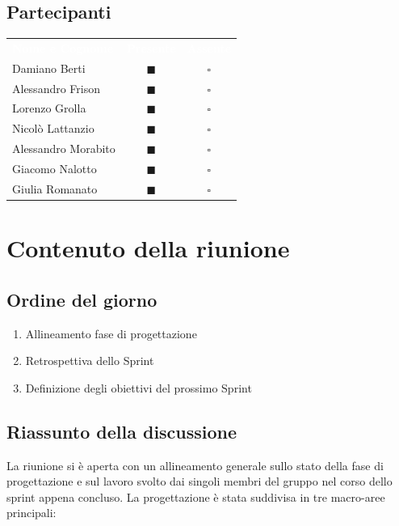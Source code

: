 \documentclass[a4paper, 11pt]{article}
\begin{document}
\subsection{Partecipanti}
\begin{center}
    \begin{tabular}{>{\raggedright\arraybackslash}p{6cm} c c}
        \rowcolor{AccentColor}
        \textcolor{white}{\textbf{Nome e Cognome}} & 
        \textcolor{white}{\textbf{Presente}} & 
        \textcolor{white}{\textbf{Assente}} \\
        
        Damiano Berti     & \textcolor{AccentColor}{$\blacksquare$}    & $\square$        \\
        Alessandro Frison     & \textcolor{AccentColor}{$\blacksquare$}    & $\square$        \\
        Lorenzo Grolla     & \textcolor{AccentColor}{$\blacksquare$}    & $\square$        \\
        Nicolò Lattanzio    & \textcolor{AccentColor}{$\blacksquare$}    & $\square$        \\
        Alessandro Morabito   & \textcolor{AccentColor}{$\blacksquare$}    & $\square$        \\
        Giacomo Nalotto   & \textcolor{AccentColor}{$\blacksquare$}    & $\square$        \\
        Giulia Romanato   & \textcolor{AccentColor}{$\blacksquare$}    & $\square$        \\
    \end{tabular}
\end{center}

\section{Contenuto della riunione}
\subsection{Ordine del giorno}
\begin{enumerate}
    \item Allineamento fase di progettazione
    \item Retrospettiva dello Sprint
    \item Definizione degli obiettivi del prossimo Sprint
\end{enumerate}
\newpage
\subsection{Riassunto della discussione}
La riunione si è aperta con un allineamento generale sullo stato della fase di progettazione e sul lavoro svolto dai singoli membri del gruppo nel corso dello sprint appena concluso. La progettazione è stata suddivisa in tre macro-aree principali:
\end{document}
